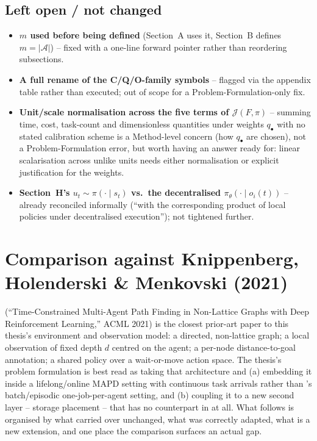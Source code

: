 \documentclass[11pt]{article}
\begin{document}
\subsection*{Left open / not changed}
\begin{itemize}
  \item \textbf{$m$ used before being defined} (Section~A uses it,
    Section~B defines $m=|\mathcal{A}|$) -- fixed with a one-line forward
    pointer rather than reordering subsections.
  \item \textbf{A full rename of the C/Q/O-family symbols} -- flagged via
    the appendix table rather than executed; out of scope for a
    Problem-Formulation-only fix.
  \item \textbf{Unit/scale normalisation across the five terms of
    $\mathcal{J}(F,\pi)$} -- summing time, cost, task-count and
    dimensionless quantities under weights $q_\bullet$ with no stated
    calibration scheme is a Method-level concern (how $q_\bullet$ are
    chosen), not a Problem-Formulation error, but worth having an answer
    ready for: linear scalarisation across unlike units needs either
    normalisation or explicit justification for the weights.
  \item \textbf{Section~H's $u_t\sim\pi(\cdot\mid s_t)$ vs.\ the
    decentralised $\pi_\theta(\cdot\mid o_i(t))$} -- already reconciled
    informally (``with the corresponding product of local policies under
    decentralised execution''); not tightened further.
\end{itemize}

\section{Comparison against Knippenberg, Holenderski \& Menkovski (2021)}
\label{sec:knippenberg}

\citet{knippenberg2021} (``Time-Constrained Multi-Agent Path Finding in
Non-Lattice Graphs with Deep Reinforcement Learning,'' ACML 2021) is the
closest prior-art paper to this thesis's environment and observation model:
a directed, non-lattice graph; a local observation of fixed depth $d$
centred on the agent; a per-node distance-to-goal annotation; a shared
policy over a wait-or-move action space. The thesis's problem formulation is
best read as taking that architecture and (a) embedding it inside a
lifelong/online MAPD setting with continuous task arrivals rather than
\citeauthor{knippenberg2021}'s batch/episodic one-job-per-agent setting, and
(b) coupling it to a new second layer -- storage placement -- that has no
counterpart in \citeauthor{knippenberg2021} at all. What follows is organised
by what carried over unchanged, what was correctly adapted, what is a new
extension, and one place the comparison surfaces an actual gap.
\end{document}
